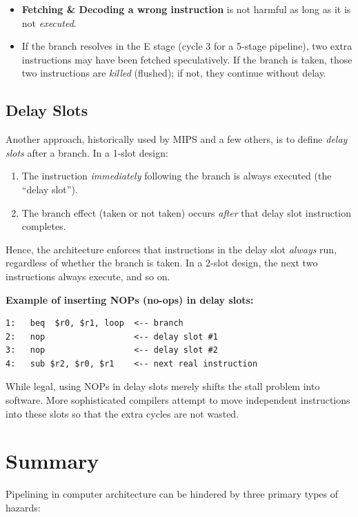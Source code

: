 \begin{itemize}
  \item \textbf{Fetching \& Decoding a wrong instruction} is not harmful as long as it is not \emph{executed}.
  \item If the branch resolves in the E stage (cycle 3 for a 5-stage pipeline), two extra instructions may have been fetched speculatively. If the branch is taken, those two instructions are \emph{killed} (flushed); if not, they continue without delay.
\end{itemize}

\subsection{Delay Slots}
Another approach, historically used by MIPS and a few others, is to define \emph{delay slots} after a branch. In a 1-slot design:
\begin{enumerate}
  \item The instruction \emph{immediately} following the branch is always executed (the ``delay slot'').
  \item The branch effect (taken or not taken) occurs \emph{after} that delay slot instruction completes.
\end{enumerate}
Hence, the architecture enforces that instructions in the delay slot \emph{always} run, regardless of whether the branch is taken. In a 2-slot design, the next two instructions always execute, and so on.

\begin{center}
\textbf{Example of inserting NOPs (no-ops) in delay slots:}
\end{center}
\begin{verbatim}
1:   beq  $r0, $r1, loop  <-- branch
2:   nop                  <-- delay slot #1
3:   nop                  <-- delay slot #2
4:   sub $r2, $r0, $r1    <-- next real instruction
\end{verbatim}
While legal, using NOPs in delay slots merely shifts the stall problem into software. More sophisticated compilers attempt to move independent instructions into these slots so that the extra cycles are not wasted.


\section{Summary}

Pipelining in computer architecture can be hindered by three primary types of hazards:

